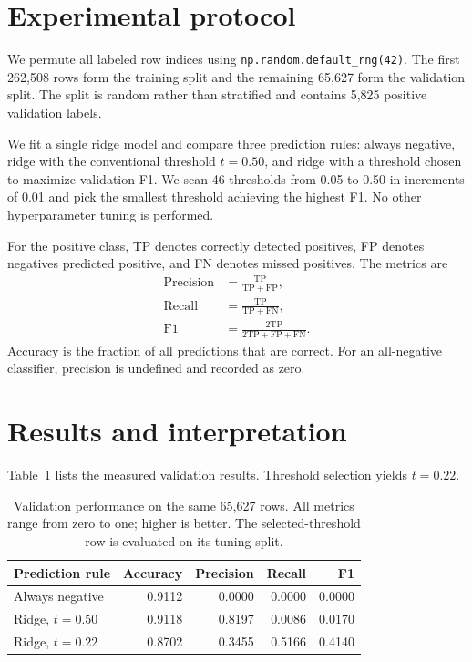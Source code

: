 \documentclass[10pt,conference,compsocconf]{IEEEtran}
\begin{document}
\section{Experimental protocol}
We permute all labeled row indices using \texttt{np.random.default\_rng(42)}. The
first 262,508 rows form the training split and the remaining 65,627 form the
validation split. The split is random rather than stratified and contains 5,825
positive validation labels.

We fit a single ridge model and compare three prediction rules: always negative,
ridge with the conventional threshold $t=0.50$, and ridge with a threshold chosen
to maximize validation F1. We scan 46 thresholds from 0.05 to 0.50 in increments
of 0.01 and pick the smallest threshold achieving the highest F1. No other
hyperparameter tuning is performed.

For the positive class, TP denotes correctly detected positives, FP denotes
negatives predicted positive, and FN denotes missed positives. The metrics are
\begin{equation}
\begin{aligned}
\mathrm{Precision}&=\frac{\mathrm{TP}}{\mathrm{TP}+\mathrm{FP}},
\\
\mathrm{Recall}&=\frac{\mathrm{TP}}{\mathrm{TP}+\mathrm{FN}},\\
\mathrm{F1}&=\frac{2\mathrm{TP}}{2\mathrm{TP}+\mathrm{FP}+\mathrm{FN}}.
\end{aligned}
\end{equation}
Accuracy is the fraction of all predictions that are correct. For an all-negative
classifier, precision is undefined and recorded as zero.

\section{Results and interpretation}
Table~\ref{tab:results} lists the measured validation results. Threshold
selection yields $t=0.22$.

\begin{table}[t]
\centering
\caption{Validation performance on the same 65,627 rows.
All metrics range from zero to one; higher is better.
The selected-threshold row is evaluated on its tuning split.}
\label{tab:results}
\small
\setlength{\tabcolsep}{3.2pt}
\begin{tabular}{lrrrr}
\toprule
Prediction rule & Accuracy & Precision & Recall & F1\\
\midrule
Always negative & 0.9112 & 0.0000 & 0.0000 & 0.0000\\
Ridge, $t=0.50$ & 0.9118 & 0.8197 & 0.0086 & 0.0170\\
Ridge, $t=0.22$ & 0.8702 & 0.3455 & 0.5166 & 0.4140\\
\bottomrule
\end{tabular}
\end{table}
\end{document}

